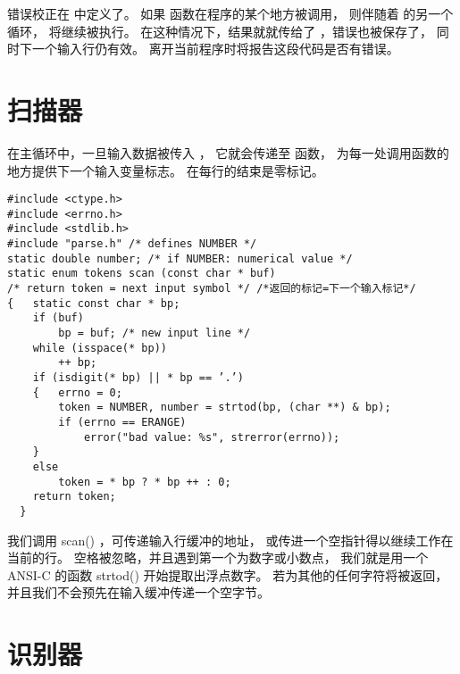 错误校正在  中定义了。
如果  函数在程序的某个地方被调用，
则伴随着  的另一个循环， 将继续被执行。
在这种情况下，结果就就传给了 ，错误也被保存了，
同时下一个输入行仍有效。
离开当前程序时将报告这段代码是否有错误。


\section{扫描器}
\label{sec:scanner}

在主循环中，一旦输入数据被传入 ，
它就会传递至  函数，
为每一处调用函数的地方提供下一个输入变量标志。
在每行的结束是零标记。

\begin{lstlisting}
#include <ctype.h>
#include <errno.h>
#include <stdlib.h>
#include "parse.h" /* defines NUMBER */
static double number; /* if NUMBER: numerical value */
static enum tokens scan (const char * buf)
/* return token = next input symbol */ /*返回的标记=下一个输入标记*/
{   static const char * bp;
    if (buf)
        bp = buf; /* new input line */
    while (isspace(* bp))
        ++ bp;
    if (isdigit(* bp) || * bp == ’.’)
    {   errno = 0;
        token = NUMBER, number = strtod(bp, (char **) & bp);
        if (errno == ERANGE)
            error("bad value: %s", strerror(errno));
    }
    else
        token = * bp ? * bp ++ : 0;
    return token;
  }
\end{lstlisting}

我们调用 scan() ，可传递输入行缓冲的地址，
或传进一个空指针得以继续工作在当前的行。
空格被忽略，并且遇到第一个为数字或小数点，
我们就是用一个ANSI-C 的函数 strtod() 开始提取出浮点数字。
若为其他的任何字符将被返回，
并且我们不会预先在输入缓冲传递一个空字节。

\section{识别器}
\label{sec:recogn}


